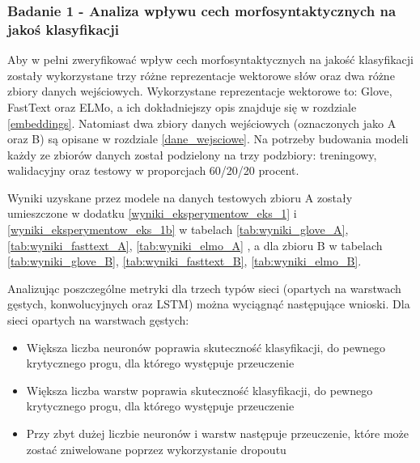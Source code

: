 \subsubsection{Badanie 1 - Analiza wpływu cech morfosyntaktycznych na jakoś klasyfikacji}

Aby w pełni zweryfikować wpływ cech morfosyntaktycznych na jakość klasyfikacji zostały wykorzystane trzy różne reprezentacje wektorowe słów oraz dwa różne zbiory danych wejściowych. Wykorzystane reprezentacje wektorowe to: Glove, FastText oraz ELMo, a ich dokładniejszy opis znajduje się w rozdziale \ref{embeddings}. Natomiast dwa zbiory danych wejściowych (oznaczonych jako A oraz B) są opisane w rozdziale \ref{dane_wejsciowe}. Na potrzeby budowania modeli każdy ze zbiorów danych został podzielony na trzy podzbiory: treningowy, walidacyjny oraz testowy w proporcjach 60/20/20 procent.

Wyniki uzyskane przez modele na danych testowych zbioru A zostały umieszczone w dodatku \ref{wyniki_eksperymentow_eks_1} i \ref{wyniki_eksperymentow_eks_1b} w tabelach \ref{tab:wyniki_glove_A}, \ref{tab:wyniki_fasttext_A}, \ref{tab:wyniki_elmo_A} , a dla zbioru B w tabelach \ref{tab:wyniki_glove_B}, \ref{tab:wyniki_fasttext_B}, \ref{tab:wyniki_elmo_B}.




Analizując poszczególne metryki dla trzech typów sieci (opartych na warstwach gęstych, konwolucyjnych oraz LSTM) można wyciągnąć następujące wnioski.  \hfill \break \hfill \break
\noindent Dla sieci opartych na warstwach gęstych:
\begin{itemize}
    \item Większa liczba neuronów poprawia skuteczność klasyfikacji, do pewnego krytycznego progu, dla którego występuje przeuczenie
    \item Większa liczba warstw poprawia skuteczność klasyfikacji, do pewnego krytycznego progu, dla którego występuje przeuczenie
    \item Przy zbyt dużej liczbie neuronów i warstw następuje przeuczenie, które może zostać zniwelowane poprzez wykorzystanie dropoutu
\end{itemize}


